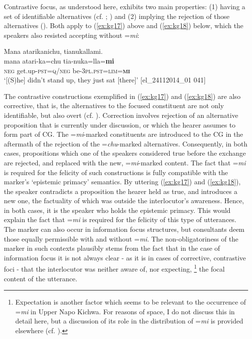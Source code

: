 \documentclass[output=paper]{langscibook}
\begin{document}
Contrastive focus, as understood here, exhibits two main properties: (1) having a set of identifiable alternatives (cf. \citealt{Kiss1998}; \citealt{Repp2010}) and (2) implying the rejection of those alternatives (\citealt[1336]{Repp2010}). Both apply to (\ref{ex:kg17}) above and (\ref{ex:kg18}) below, which the speakers also resisted accepting without =\textit{mi}:

 
\begin{exe}
	\ex \label{ex:kg18}
	\glll Mana atarikanichu, tianukallami.\\
	mana atari-ka=chu tia-nuka=lla=\textbf{mi}\\
	\textsc{neg} get.up-\textsc{pst}=\textsc{q}/\textsc{neg}  be-3\textsc{pl}.\textsc{pst}=\textsc{lim}=\textbf{\textsc{mi}}\\
	\trans ‘[(S)he] didn't stand up, they just sat [there]’ [el\_24112014\_01   041]
\end{exe}

The contrastive constructions exemplified in (\ref{ex:kg17}) and (\ref{ex:kg18}) are also corrective, that is, the alternatives to the focused constituent are not only identifiable, but also overt (cf. \citealt{Repp2010}).  Correction involves rejection of an alternative proposition that is currently under discussion, or which the hearer assumes to form part of CG. The =\textit{mi}-marked constituents are introduced to the CG in the aftermath of the rejection of the =\textit{chu}-marked alternatives. Consequently, in both cases, propositions which one of the speakers considered true before the exchange are rejected, and replaced with the new, =\textit{mi}-marked content. The fact that =\textit{mi} is required for the felicity of such constructions is fully compatible with the marker’s ‘epistemic primacy’ semantics. By uttering (\ref{ex:kg17}) and (\ref{ex:kg18}), the speaker contradicts a proposition the hearer held as true, and introduces a new one, the factuality of which was outside the interlocutor’s awareness. Hence, in both cases, it is the speaker who holds the epistemic primacy. This would explain the fact that =\textit{mi} is required for the felicity of this type of utterances. The marker can also occur in information focus structures, but consultants deem those equally permissible with and without =\textit{mi}. The non-obligatoriness of the marker in such contexts plausibly stems from the fact that in the case of information focus it is not always clear - as it is in cases of corrective, contrastive foci - that the interlocutor was neither aware of, nor expecting, \footnote{Expectation is another factor which seems to be relevant to the occurrence of =\textit{mi} in Upper Napo Kichwa. For reasons of space, I do not discuss this in detail here, but a discussion of its role in the distribution of =\textit{mi} is provided elsewhere (cf. \citealt[ch.6]{Grzech2016a}).} the focal content of the utterance.
\end{document}
